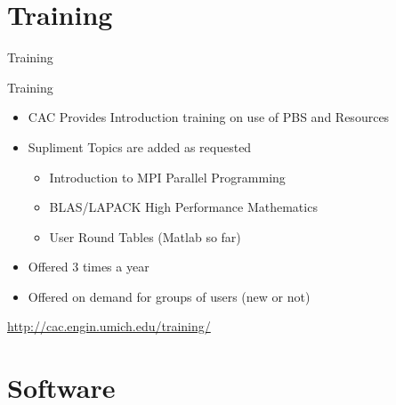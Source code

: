 \documentclass[handout]{beamer}
\begin{document}
  \section {Training}
     \begin{frame}{Training}
      \begin{block}{Training}
       \begin{itemize}
        \item CAC Provides Introduction training on use of PBS and Resources
        \item Supliment Topics are added as requested
        \begin{itemize}
         \item Introduction to MPI Parallel Programming
         \item BLAS/LAPACK High Performance Mathematics
         \item User Round Tables (Matlab so far)
        \end{itemize}
        \item Offered 3 times a year
        \item Offered on demand for groups of users (new or not)
       \end{itemize}
      \end{block}
      \url{http://cac.engin.umich.edu/training/}
     \end{frame}
  \section {Software}
\end{document}
